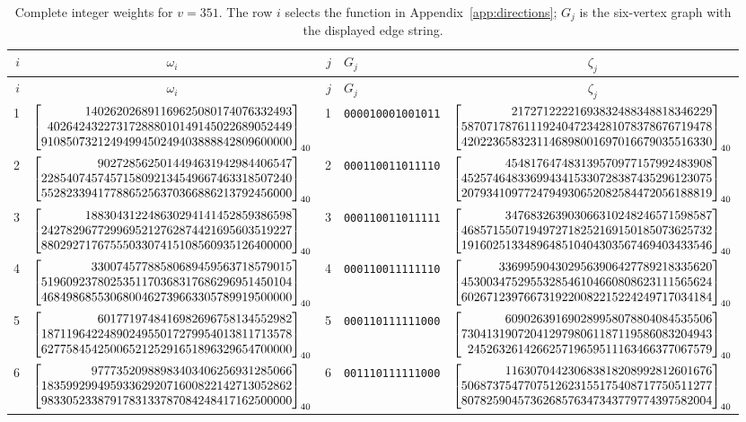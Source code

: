 \documentclass[11pt]{article}
\theoremstyle{remark}
\numberwithin{equation}{section}
\begin{document}
\begin{longtable}{rcrlc}
\caption{Complete integer weights for $v=351$. The row $i$ selects the function in Appendix~\ref{app:directions}; $G_j$ is the six-vertex graph with the displayed edge string.}\label{tab:six351-weights}\\
\toprule $i$&$\omega_i$&$j$&$G_j$&$\zeta_j$\\\midrule\endfirsthead
\toprule $i$&$\omega_i$&$j$&$G_j$&$\zeta_j$\\\midrule\endhead
\bottomrule\endfoot

1&$\srgBigInt{140262026891169625080174076332493}{402642432273172888010149145022689052449}{9108507321249499450249403888842809600000}$&1&\texttt{000010001001011}&$\srgBigInt{21727122221693832488348818346229}{5870717876111924047234281078378676719478}{4202236583231146898001697016679035516330}$\\[1pt]

2&$\srgBigInt{9027285625014494631942984406547}{2285407457457158092134549667463318507240}{5528233941778865256370366886213792456000}$&2&\texttt{000110011011110}&$\srgBigInt{454817647483139570977157992483908}{4525746483369943415330728387435296123075}{2079341097724794930652082584472056188819}$\\[1pt]

3&$\srgBigInt{188304312248630294141452859386598}{2427829677299695212762874421695603519227}{8802927176755503307415108560935126400000}$&3&\texttt{000110011011111}&$\srgBigInt{347683263903066310248246571598587}{4685715507194972718252169150185073625732}{1916025133489648510404303567469403433546}$\\[1pt]

4&$\srgBigInt{33007457788580689459563718579015}{5196092378025351170368317686296951450104}{4684986855306800462739663305789919500000}$&4&\texttt{000110011111110}&$\srgBigInt{3369959043029563906427789218335620}{4530034752955328546104660808623111565624}{6026712397667319220082215224249717034184}$\\[1pt]

5&$\srgBigInt{6017719748416982696758134552982}{1871196422489024955017279954013811713578}{6277584542500652125291651896329654700000}$&5&\texttt{000110111111000}&$\srgBigInt{609026391690289958078804084535506}{7304131907204129798061187119586083204943}{245263261426625719659511163466377067579}$\\[1pt]

6&$\srgBigInt{97773520988983403406256931285066}{1835992994959336292071600822142713052862}{9833052338791783133787084248417162500000}$&6&\texttt{001110111111000}&$\srgBigInt{116307044230683818208992812601676}{5068737547707512623155175408717750511277}{8078259045736268576347343779774397582004}$\\[1pt]


\end{longtable}
\end{document}
